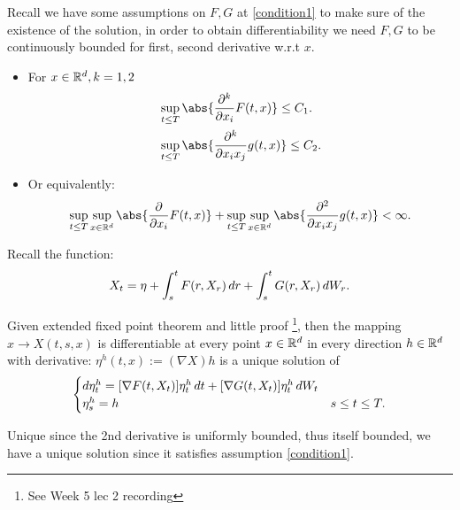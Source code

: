 \begin{assmp}\label{condition2} 

Recall we have some assumptions on $F, G$ at \ref{condition1} to make sure of the existence of the solution, in order to obtain differentiability we need $F, G$ to be continuously bounded for first, second derivative w.r.t $x$.
\begin{itemize}
        \item For $x\in \mathbb{R}^d, k=1,2$ 
        \begin{align*}
            &\sup_{t\leq T}\abs{\frac{\partial^k}{\partial x_i} F(t,x)} \leq C_1.\\
            &\sup_{t\leq T}\abs{\frac{\partial^k}{\partial x_ix_j} g(t,x)} \leq C_2.
        \end{align*}
    \item Or equivalently:
    \begin{equation*}
        \sup_{t\leq T}\sup_{x\in\R^d}\abs{\frac{\partial}{\partial x_i} F(t,x)} + \sup_{t\leq T}\sup_{x\in\R^d}\abs{\frac{\partial^2}{\partial x_ix_j} g(t,x)} <\infty.
    \end{equation*}
\end{itemize}
    
\end{assmp}
Recall the function:
\begin{equation*}
    X_t = \eta + \int_s^t F(r,X_r) \mathop{}\!d r+\int_s^t G(r,X_r) \mathop{}\!d W_r.
\end{equation*}

\begin{thm}\label{Thm: directional}

Given extended fixed point theorem and little proof \footnote{See Week 5 lec 2 recording}, then the mapping $x\rightarrow X(t,s,x)$ is differentiable at every point $x\in\mathbb{R}^d$ in every direction $h\in\mathbb{R}^d$ with derivative: $\eta^h(t,x) := (\nabla X)h$ is a unique solution of
\begin{equation*}
    \begin{cases}
    \mathop{}\!d \eta_t^h = [\nabla F(t,X_t)]\eta_t^h \mathop{}\!d t + [\nabla G(t,X_t)]\eta_t^h \mathop{}\!d W_t \\
    \eta_s^h = h &s\leq t\leq T.
    \end{cases}
\end{equation*}
\end{thm}

Unique since the 2nd derivative is uniformly bounded, thus itself bounded, we have a unique solution since it satisfies assumption \ref{condition1}.

